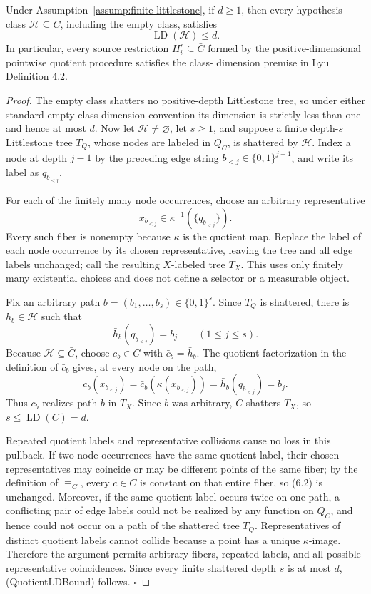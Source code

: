 \begin{lemma}\label{lem:step-001-quotient-ld}
Under Assumption~\ref{assump:finite-littlestone}, if \(d\ge1\), then every
hypothesis class \(\mathcal H\subseteq\bar C\), including the empty class,
satisfies
\[
\operatorname{LD}(\mathcal H)\le d.
\tag{QuotientLDBound}
\]
In particular, every source restriction \(H_i^r\subseteq\bar C\) formed by
the positive-dimensional pointwise quotient procedure satisfies the class-
dimension premise in Lyu~\citep{lyu2025} Definition 4.2.


\end{lemma}

\begin{proof}
The empty class shatters no positive-depth Littlestone tree, so
under either standard empty-class dimension convention its dimension is
strictly less than one and hence at most \(d\). Now let
\(\mathcal H\ne\varnothing\), let \(s\ge1\), and suppose a
finite depth-\(s\) Littlestone tree \(T_Q\), whose nodes are labeled in
\(Q_C\), is shattered by \(\mathcal H\). Index a node at depth \(j-1\) by
the preceding edge string \(b_{<j}\in\{0,1\}^{j-1}\), and write its label
as \(q_{b_{<j}}\).

For each of the finitely many node occurrences, choose an arbitrary
representative
\[
x_{b_{<j}}\in\kappa^{-1}(\{q_{b_{<j}}\}).
\]
Every such fiber is nonempty because \(\kappa\) is the quotient map. Replace
the label of each node occurrence by its chosen representative, leaving the
tree and all edge labels unchanged; call the resulting \(X\)-labeled tree
\(T_X\). This uses only finitely many existential choices and does not
define a selector or a measurable object.

Fix an arbitrary path \(b=(b_1,\ldots,b_s)\in\{0,1\}^s\). Since \(T_Q\)
is shattered, there is \(\bar h_b\in\mathcal H\) such that
\[
\bar h_b(q_{b_{<j}})=b_j\qquad(1\le j\le s).
\tag{6.1}
\]
Because \(\mathcal H\subseteq\bar C\), choose \(c_b\in C\) with
\(\bar c_b=\bar h_b\). The quotient factorization in the definition of
\(\bar c_b\) gives, at every node on the path,
\[
c_b(x_{b_{<j}})
=\bar c_b(\kappa(x_{b_{<j}}))
=\bar h_b(q_{b_{<j}})
=b_j.
\tag{6.2}
\]
Thus \(c_b\) realizes path \(b\) in \(T_X\). Since \(b\) was arbitrary,
\(C\) shatters \(T_X\), so \(s\le\operatorname{LD}(C)=d\).

Repeated quotient labels and representative collisions cause no loss in
this pullback. If two node occurrences have the same quotient label, their
chosen representatives may coincide or may be different points of the same
fiber; by the definition of \(\equiv_C\), every \(c\in C\) is constant on
that entire fiber, so (6.2) is unchanged. Moreover, if the same quotient
label occurs twice on one path, a conflicting pair of edge labels could not
be realized by any function on \(Q_C\), and hence could not occur on a path
of the shattered tree \(T_Q\). Representatives of distinct quotient labels
cannot collide because a point has a unique \(\kappa\)-image. Therefore the
argument permits arbitrary fibers, repeated labels, and all possible
representative coincidences. Since every finite shattered depth \(s\) is at
most \(d\), (QuotientLDBound) follows. \(\square\)



\end{proof}
